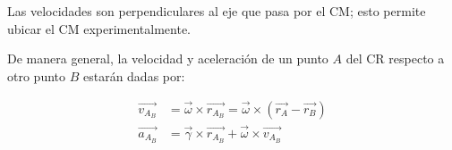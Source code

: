 \documentclass{article}
\begin{document}
Las velocidades son perpendiculares al eje que pasa por el CM; esto permite ubicar el CM experimentalmente.

De manera general, la velocidad y aceleración de un punto $A$ del CR respecto a otro punto $B$ estarán dadas por:

\begin{subequations}
\begin{align}
\overrightarrow{v_{A_B}} &= \overrightarrow{\omega} \times \overrightarrow{r_{A_B}} = \overrightarrow{\omega} \times (\overrightarrow{r_A} - \overrightarrow{r_B}) \\
\overrightarrow{a_{A_B}} &= \overrightarrow{\gamma} \times \overrightarrow{r_{A_B}} + \overrightarrow{\omega} \times \overrightarrow{v_{A_B}}
\end{align}
\end{subequations}
\end{document}
